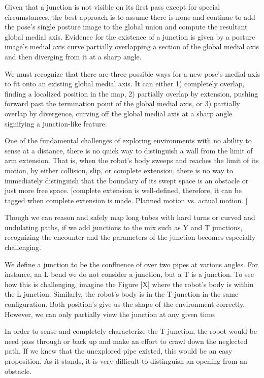 Given that a junction is not visible on its first pass except for special circumstances, the best approach is to assume there is none and continue to add the pose's single posture image to the global union and compute the resultant global medial axis. Evidence for the existence of a junction is given by a posture image's medial axis curve partially overlapping a section of the global medial axis and then diverging from it at a sharp angle. 

We must recognize that there are three possible ways for a new pose's medial axis to fit onto an existing global medial axis. It can either 1) completely overlap, finding a localized position in the map, 2) partially overlap by extension, pushing forward past the termination point of the global medial axis, or 3) partially overlap by divergence, curving off the global medial axis at a sharp angle signifying a junction-like feature.

One of the fundamental challenges of exploring environments with no ability to sense at a distance, there is no quick way to distinguish a wall from the limit of arm extension. That is, when the robot's body sweeps and reaches the limit of its motion, by either collision, slip, or complete extension, there is no way to immediately distinguish that the boundary of its swept space is an obstacle or just more free space. [complete extension is well-defined, therefore, it can be tagged when complete extension is made. Planned motion vs. actual motion. ]

Though we can reason and safely map long tubes with hard turns or curved and undulating paths, if we add junctions to the mix such as Y and T junctions, recognizing the encounter and the parameters of the junction becomes especially challenging.

We define a junction to be the confluence of over two pipes at various angles. For instance, an L bend we do not consider a junction, but a T is a junction. To see how this is challenging, imagine the Figure [X] where the robot's body is within the L junction. Similarly, the robot's body is in the T-junction in the same configuration. Both position's give us the shape of the environment correctly. However, we can only partially view the junction at any given time.

In order to sense and completely characterize the T-junction, the robot would be need pass through or back up and make an effort to crawl down the neglected path. If we knew that the unexplored pipe existed, this would be an easy proposition. As it stands, it is very difficult to distinguish an opening from an obstacle.

